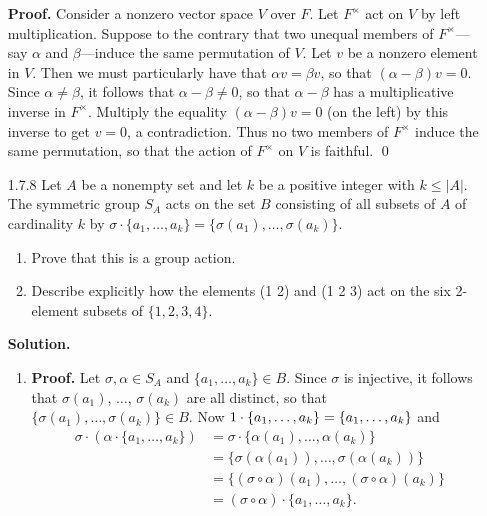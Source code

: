 \begin{enumerate}
      \textbf{Proof.} Consider a nonzero vector space $V$ over $F$. Let
      $F^\times$ act on $V$ by left multiplication. Suppose to the contrary that
      two unequal members of $F^\times$---say $\alpha$ and $\beta$---induce the 
      same permutation of $V$. Let $v$ be a nonzero element in $V$. Then we must 
      particularly have that $\alpha v = \beta v$, so that
      $(\alpha - \beta)v = 0$. Since $\alpha \neq \beta$, it follows that
      $\alpha - \beta \neq 0$, so that $\alpha - \beta$ has a multiplicative 
      inverse in $F^\times$. Multiply the equality $(\alpha - \beta)v = 0$ (on
      the left) by this inverse to get $v = 0$, a contradiction. Thus no two 
      members of $F^\times$ induce the same permutation, so that the action of
      $F^\times$ on $V$ is faithful. \qed
   \item[1.7.8]   Let $A$ be a nonempty set and let $k$ be a positive integer
                  with $k \le |A|$. The symmetric group $S_A$ acts on the set
                  $B$ consisting of all subsets of $A$ of cardinality $k$ by
                  $\sigma \cdot \{a_1, \ldots, a_k\} = \{\sigma(a_1), \ldots,
                   \sigma(a_k)\}$.
                  \begin{enumerate}
                     \item Prove that this is a group action.
                     \item Describe explicitly how the elements (1 2) and
                           (1 2 3) act on the six 2-element subsets of
                           $\{1, 2, 3, 4\}$.
                  \end{enumerate}

      \textbf{Solution.}
   
      \begin{enumerate}
         \item \textbf{Proof.} Let $\sigma, \alpha \in S_A$ and
               $\{a_1, \ldots, a_k\} \in B$. Since $\sigma$ is injective, it 
               follows that $\sigma(a_1)$, $\ldots$, $\sigma(a_k)$ are all 
               distinct, so that $\{\sigma(a_1), \ldots, \sigma(a_k)\} \in B$.
               Now $1 \cdot\nobreak \{a_1, \ldots, a_k\} = \{a_1, \ldots, a_k\}$
               and
               \begin{align*}
                  \sigma \cdot (\alpha \cdot \{a_1, \ldots, a_k\}) &=
                     \sigma \cdot \{\alpha(a_1), \ldots, \alpha(a_k)\} \\
                     &= \{\sigma(\alpha(a_1)), \ldots, \sigma(\alpha(a_k))\} \\
                     &= \{(\sigma\circ\alpha)(a_1), \ldots,
                          (\sigma\circ\alpha)(a_k)\} \\
                     &= (\sigma\circ\alpha) \cdot \{a_1, \ldots, a_k\}.
               \end{align*}
               

\end{enumerate}
\end{enumerate}
